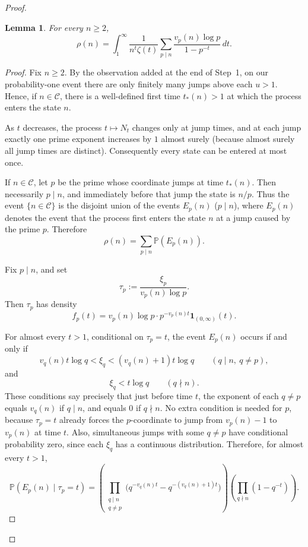 \documentclass[11pt,letterpaper,reqno]{amsart}
\newtheorem{lemma}[theorem]{Lemma}
\theoremstyle{definition}
\numberwithin{equation}{section}
\newcommand{\1}{\mathbf 1}
\begin{document}
\begin{proof}
\begin{lemma}\label{lem:visit-formula}
For every $n\ge 2$,
\[
\rho(n)
=
\int_1^\infty
\frac{1}{n^t\zeta(t)}
\sum_{p\mid n}\frac{v_p(n)\log p}{1-p^{-t}}
\,dt.
\]
\end{lemma}

\begin{proof}
Fix \(n\ge 2\). By the observation added at the end of Step~1, on our probability-one event there are only finitely many jumps above each \(u>1\). Hence, if \(n\in\mathcal C\), there is a well-defined first time \(t_*(n)>1\) at which the process enters the state \(n\).

As \(t\) decreases, the process \(t\mapsto N_t\) changes only at jump times, and at each jump exactly one prime exponent increases by \(1\) almost surely (because almost surely all jump times are distinct). Consequently every state can be entered at most once.

If \(n\in\mathcal C\), let \(p\) be the prime whose coordinate jumps at time \(t_*(n)\). Then necessarily \(p\mid n\), and immediately before that jump the state is \(n/p\). Thus the event \(\{n\in\mathcal C\}\) is the disjoint union of the events \(E_p(n)\) (\(p\mid n\)), where \(E_p(n)\) denotes the event that the process first enters the state \(n\) at a jump caused by the prime \(p\). Therefore
\[
\rho(n)=\sum_{p\mid n}\mathbb P(E_p(n)).
\]

Fix \(p\mid n\), and set
\[
\tau_p:=\frac{\xi_p}{v_p(n)\log p}.
\]
Then \(\tau_p\) has density
\[
f_p(t)=v_p(n)\log p\cdot p^{-v_p(n)t}\mathbf 1_{(0,\infty)}(t).
\]

For almost every \(t>1\), conditional on \(\tau_p=t\), the event \(E_p(n)\) occurs if and only if
\[
v_q(n)t\log q<\xi_q<(v_q(n)+1)t\log q
\qquad (q\mid n,\ q\ne p),
\]
and
\[
\xi_q<t\log q
\qquad (q\nmid n).
\]
These conditions say precisely that just before time \(t\), the exponent of each \(q\ne p\) equals \(v_q(n)\) if \(q\mid n\), and equals \(0\) if \(q\nmid n\). No extra condition is needed for \(p\), because \(\tau_p=t\) already forces the \(p\)-coordinate to jump from \(v_p(n)-1\) to \(v_p(n)\) at time \(t\). Also, simultaneous jumps with some \(q\neq p\) have conditional probability zero, since each \(\xi_q\) has a continuous distribution. Therefore, for almost every \(t>1\),
\[
\mathbb P(E_p(n)\mid \tau_p=t)
=
\left(
\prod_{\substack{q\mid n\\ q\ne p}}
\bigl(q^{-v_q(n)t}-q^{-(v_q(n)+1)t}\bigr)
\right)
\left(
\prod_{q\nmid n}(1-q^{-t})
\right).
\]


\end{proof}
\end{proof}
\end{document}
